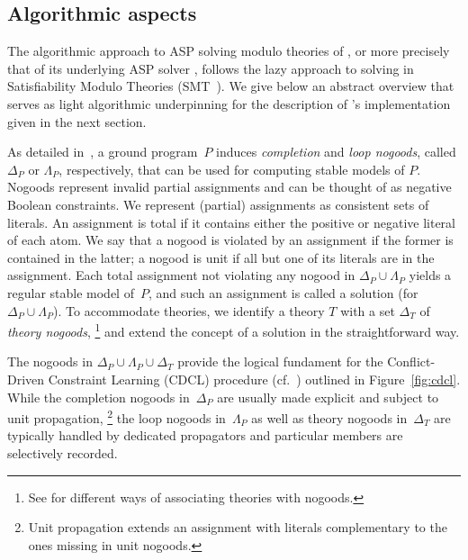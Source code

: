 \subsection{Algorithmic aspects}
\label{sec:algo}

The algorithmic approach to ASP solving modulo theories of \clingo, 
or more precisely that of its underlying ASP solver \clasp, 
follows the lazy approach to solving in Satisfiability Modulo Theories (SMT~\cite{baseseti09a}).
We give below an abstract overview that serves as light algorithmic underpinning for the description of \clingo's implementation
given in the next section.

As detailed in~\cite{gekasc09c}, a ground program~$P$ induces
\emph{completion} and \emph{loop nogoods}, called $\Delta_P$ or $\Lambda_P$, respectively,
that can be used for computing stable models of $P$.
%
Nogoods represent invalid partial assignments and can be thought of as negative Boolean constraints.
%
We represent (partial) assignments as consistent sets of literals.
%
An assignment is total if it contains either the positive or negative literal of each atom.
We say that a nogood is violated by an assignment if the former is contained in the latter;
a nogood is unit if all but one of its literals are in the assignment. 
%
Each total assignment not violating any nogood in $\Delta_P\cup\Lambda_P$
yields a regular stable model of~$P$, and such an assignment is called a solution
(for $\Delta_P\cup\Lambda_P$).
%
To accommodate theories,
we identify a theory $T$ with a set $\Delta_T$ of \emph{theory nogoods},%
\footnote{See \cite{gekakaosscwa16a} for different ways of associating theories with nogoods.}
and extend the concept of a solution in the straightforward way.

The nogoods in $\Delta_P\cup\Lambda_P\cup\Delta_T$ provide the
logical fundament for the Conflict-Driven Constraint Learning (CDCL) procedure
(cf.\ \cite{malyma09a,gekasc09c})
outlined in Figure~\ref{fig:cdcl}.
While the completion nogoods in~$\Delta_P$ are usually made explicit and subject to
unit propagation,%
\footnote{Unit propagation extends an assignment with literals complementary to the ones missing in unit nogoods.}
the loop nogoods in~$\Lambda_P$ as well as theory nogoods in~$\Delta_T$ are typically
handled by dedicated propagators and particular members are selectively recorded.

